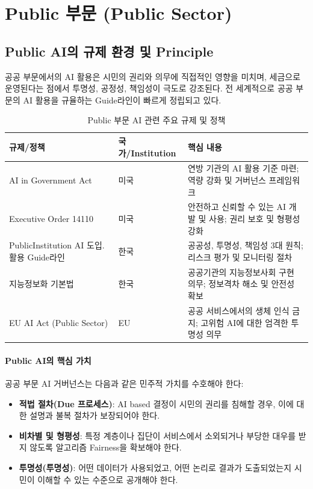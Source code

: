 \section{Public 부문 (Public Sector)}
\label{sec:5.3}

\subsection{Public AI의 규제 환경 및 Principle}
\label{sec:5.3.1}

공공 부문에서의 AI 활용은 시민의 권리와 의무에 직접적인 영향을 미치며, 세금으로 운영된다는 점에서 투명성, 공정성, 책임성이 극도로 강조된다. 전 세계적으로 공공 부문의 AI 활용을 규율하는 Guide라인이 빠르게 정립되고 있다.

\begin{table}[htbp]
\centering
\caption{Public 부문 AI 관련 주요 규제 및 정책}
\label{tab:public_regulations}
\begin{tabularx}{\textwidth}{p{3.5cm}p{2.5cm}X}
\toprule
\textbf{규제/정책} & \textbf{국가/Institution} & \textbf{핵심 내용} \\
\midrule
AI in Government Act & 미국 & 연방 기관의 AI 활용 기준 마련; 역량 강화 및 거버넌스 프레임워크 \\
\midrule
Executive Order 14110 & 미국 & 안전하고 신뢰할 수 있는 AI 개발 및 사용; 권리 보호 및 형평성 강화 \\
\midrule
PublicInstitution AI 도입.활용 Guide라인 & 한국 & 공공성, 투명성, 책임성 3대 원칙; 리스크 평가 및 모니터링 절차 \\
\midrule
지능정보화 기본법 & 한국 & 공공기관의 지능정보사회 구현 의무; 정보격차 해소 및 안전성 확보 \\
\midrule
EU AI Act (Public Sector) & EU & 공공 서비스에서의 생체 인식 금지; 고위험 AI에 대한 엄격한 투명성 의무 \\
\bottomrule
\end{tabularx}
\end{table}

\paragraph{Public AI의 핵심 가치}
공공 부문 AI 거버넌스는 다음과 같은 민주적 가치를 수호해야 한다:
\begin{itemize}
 \item \textbf{적법 절차(Due 프로세스)}: AI based 결정이 시민의 권리를 침해할 경우, 이에 대한 설명과 불복 절차가 보장되어야 한다.
 \item \textbf{비차별 및 형평성}: 특정 계층이나 집단이 서비스에서 소외되거나 부당한 대우를 받지 않도록 알고리즘 Fairness을 확보해야 한다.
 \item \textbf{투명성(투명성)}: 어떤 데이터가 사용되었고, 어떤 논리로 결과가 도출되었는지 시민이 이해할 수 있는 수준으로 공개해야 한다.
\end{itemize}


